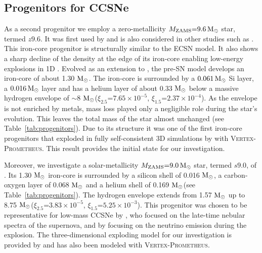 \documentclass[fleqn,usenatbib]{mnras}
\newcommand{\solm}{\ensuremath{\rm{M_{\odot}}}\xspace}
\newcommand{\vertexprom}{\textsc{Vertex-Prometheus}\xspace}
\newcommand{\GEO}[1]{{\color{red}#1}}
\begin{document}
\subsection{Progenitors for CCSNe}
As a second progenitor we employ a zero-metallicity $M_{\text{ZAMS}}\mathord{=}9.6\,\solm$ star, termed $z9.6$. It was first used by \citet{Janka2012} and is also considered in other studies such as \citet{Mueller2013,Mueller2018}. This iron-core progenitor is structurally similar to the ECSN model. It also shows a sharp decline of the density at the edge of its iron-core enabling low-energy explosions in 1D \citep{Melson2015}. 
Evolved as an extension to \cite{Heger2010}, the pre-SN model develops an iron-core of about 1.30 \solm. The iron-core is surrounded by a $0.061\,\solm$ Si layer, a $0.016\,\solm$ layer and has a helium layer of about \GEO{0.33} \solm below a massive hydrogen envelope of $\mathord{\sim}8$ \solm ($\xi_{2.5}\mathord{=}7.65 \times 10^{-5}$, $\xi_{1.5}\mathord{=}2.37 \times 10^{-4}$). As the envelope is not enriched by metals, mass loss played only a negligible role during the star's evolution. This leaves the total mass of the star almost unchanged (see Table~\ref{tab:progenitors}). 
Due to its structure it was one of the first iron-core progenitors that exploded in fully self-consistent 3D simulations by \cite{Melson2015a} with \vertexprom. This result provides the initial state for our investigation. 

Moreover, we investigate a solar-metallicity $M_{\text{ZAMS}} \mathord{=} 9.0 \,\solm$ star, termed $s9.0$, of \citet{Sukhbold2016}. \GEO{Its 1.30 \solm iron-core is surrounded by a silicon shell of 0.016 \solm, a carbon-oxygen layer of 0.068 \solm and a helium shell of 0.169 \solm (see Table~\ref{tab:progenitors})}. The hydrogen envelope extends from 1.57 \solm up to 8.75 \solm ($\xi_{2.5}\mathord{=}3.83 \times 10^{-5}$, $\xi_{1.5}\mathord{=}5.25 \times 10^{-3}$).
This progenitor was chosen to be representative for low-mass CCSNe by \cite{Jerkstrand2018}, who focused on the late-time nebular spectra of the supernova, and by \cite{Glas2019} focusing on the neutrino emission during the explosion. The three-dimensional exploding model for our investigation is provided by \citet{Melson2019} and has also been modeled with \vertexprom. 
\end{document}
